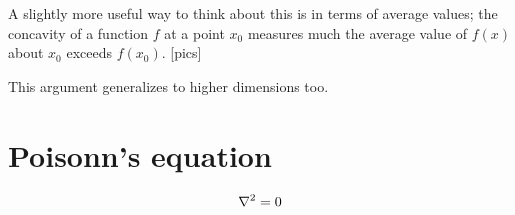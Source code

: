\documentclass{article}
\begin{document}
A slightly more useful way to think about this is in terms of average values; the concavity of a function $f$ at a point $x_0$ measures much the average value of $f(x)$ about $x_0$ exceeds $f(x_0)$. [pics]

This argument generalizes to higher dimensions too.

\section{Poisonn's equation}

\begin{eqnarray*}
\nabla^2 = 0
\end{eqnarray*}
\end{document}
